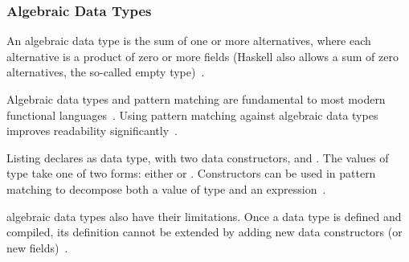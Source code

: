 \begin{frame}\frametitle{Algebraic Data Types}

An algebraic data type is the sum of one or more alternatives, where each alternative is a product of zero or more fields (Haskell also allows a sum of zero alternatives, the so-called empty type)~\cite{history-of-haskell}. 

Algebraic data types and pattern matching are fundamental to most modern functional languages~\cite{trees-that-grow}. Using pattern matching against algebraic data types improves readability significantly~\cite{history-of-haskell}.
    

Listing  declares  as data type, with two data constructors,  and . The values of type  take one of two forms: either  or . Constructors can be used in pattern matching to decompose both a value of type and an expression~\cite{history-of-haskell}. 
    

algebraic data types also have their limitations. Once a data type is defined and compiled, its definition cannot be extended by adding new data constructors (or new fields)~\cite{trees-that-grow}.

\end{frame}

